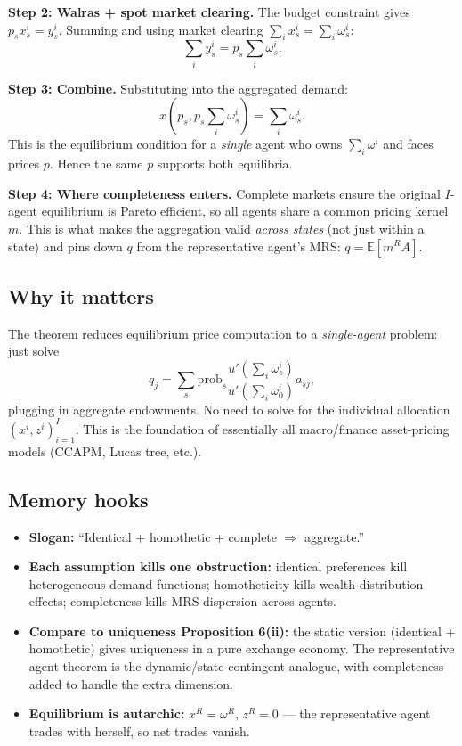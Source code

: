 \medskip
\textbf{Step 2: Walras + spot market clearing.} The budget constraint gives $p_s x_s^i = y_s^i$. Summing and using market clearing $\sum_i x_s^i = \sum_i \omega_s^i$:
\[
\sum_i y_s^i = p_s \sum_i \omega_s^i.
\]

\medskip
\textbf{Step 3: Combine.} Substituting into the aggregated demand:
\[
x\!\left(p_s, p_s \sum_i \omega_s^i\right) = \sum_i \omega_s^i.
\]
This is the equilibrium condition for a \emph{single} agent who owns $\sum_i \omega^i$ and faces prices $p$. Hence the same $p$ supports both equilibria.

\medskip
\textbf{Step 4: Where completeness enters.} Complete markets ensure the original $I$-agent equilibrium is Pareto efficient, so all agents share a common pricing kernel $m$. This is what makes the aggregation valid \emph{across states} (not just within a state) and pins down $q$ from the representative agent's MRS: $q = \mathbb{E}[m^R A]$.

\subsection*{Why it matters}

The theorem reduces equilibrium price computation to a \emph{single-agent} problem: just solve
\[
q_j = \sum_{s} \mathrm{prob}_s \frac{u'\!\left(\sum_i \omega_s^i\right)}{u'\!\left(\sum_i \omega_0^i\right)} a_{sj},
\]
plugging in aggregate endowments. No need to solve for the individual allocation $(x^i, z^i)_{i=1}^I$. This is the foundation of essentially all macro/finance asset-pricing models (CCAPM, Lucas tree, etc.).

\subsection*{Memory hooks}

\begin{itemize}
    \item \textbf{Slogan:} ``Identical + homothetic + complete $\Rightarrow$ aggregate.''
    \item \textbf{Each assumption kills one obstruction:} identical preferences kill heterogeneous demand functions; homotheticity kills wealth-distribution effects; completeness kills MRS dispersion across agents.
    \item \textbf{Compare to uniqueness Proposition 6(ii):} the static version (identical + homothetic) gives uniqueness in a pure exchange economy. The representative agent theorem is the dynamic/state-contingent analogue, with completeness added to handle the extra dimension.
    \item \textbf{Equilibrium is autarchic:} $x^R = \omega^R$, $z^R = 0$ — the representative agent trades with herself, so net trades vanish.
\end{itemize}

